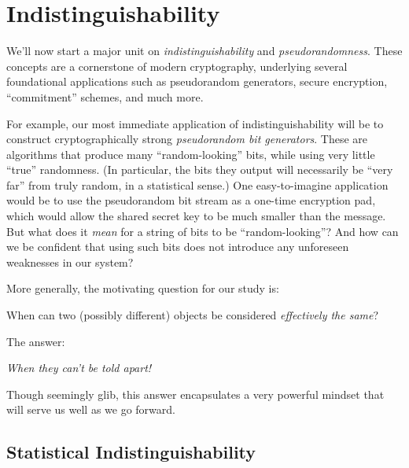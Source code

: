 \documentclass[11pt]{article}
\begin{document}
\thispagestyle{fancy} %


\section{Indistinguishability}
\label{sec:indistinguishability}

We'll now start a major unit on \emph{indistinguishability} and
\emph{pseudorandomness}.  These concepts are a cornerstone of modern
cryptography, underlying several foundational applications such as
pseudorandom generators, secure encryption, ``commitment'' schemes,
and much more.

For example, our most immediate application of indistinguishability
will be to construct cryptographically strong \emph{pseudorandom bit
  generators}.  These are algorithms that produce many
``random-looking'' bits, while using very little ``true'' randomness.
(In particular, the bits they output will necessarily be ``very far''
from truly random, in a statistical sense.)  One easy-to-imagine
application would be to use the pseudorandom bit stream as a one-time
encryption pad, which would allow the shared secret key to be much
smaller than the message.  But what does it \emph{mean} for a string
of bits to be ``random-looking''?  And how can we be confident that
using such bits does not introduce any unforeseen weaknesses in our
system?

More generally, the motivating question for our study is:
\begin{center}
  When can two (possibly different) objects be considered
  \emph{effectively the same}?
\end{center}
The answer:
\begin{center}
  \emph{When they can't be told apart!}
\end{center}
Though seemingly glib, this answer encapsulates a very powerful
mindset that will serve us well as we go forward.

\subsection{Statistical Indistinguishability}
\label{sec:stat-indist}
\end{document}
